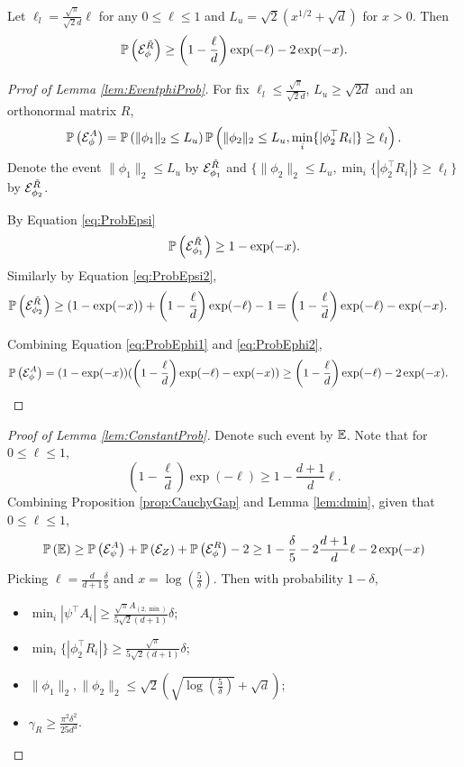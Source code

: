 \begin{lemma}
	\label{lem:EventphiProb}
	Let $\ell_l = \frac{\sqrt{\pi}}{\sqrt{2}d}\ell$ for any $0\le \ell\le 1$ and $ L_u = \sqrt{2}\left(x^{1/2}+\sqrt{d}\right)$ for $x>0$. Then
	\[
	\mathbb{P}\left(\mathcal{E}^{\tilde{R}}_{\phi}\right) \ge \left(1- \frac{\ell}{d}\right)\exp(-\ell) - 2\exp(-x).
	\]
\end{lemma}
\begin{proof}[Prrof of Lemma \ref{lem:EventphiProb}]
	For fix $\ell_l\le \frac{\sqrt{\pi}}{\sqrt{2}d}$, $L_u \ge \sqrt{2d}$ and an orthonormal matrix $R$, 
	\[
	\mathbb{P}\left(\mathcal{E}^A_{\phi}\right) = \mathbb{P}\left(\|\phi_1\|_2\le L_u\right)\mathbb{P}\left(\|\phi_2\|_2\le L_u, \min_i \{|\phi_2^{\top}R_i|\} \ge \ell_l\right).
	\]
	Denote the event $\|\phi_1\|_2\le L_u$ by $\mathcal{E}^{\tilde{R}}_{\phi_1}$ and $\{\|\phi_2\|_2\le L_u, \min_i \{|\phi_2^{\top}R_i|\} \ge \ell_l\}$ by $\mathcal{E}^{\tilde{R}}_{\phi_2}$. 
	
	By Equation \eqref{eq:ProbEpsi}
	\begin{equation}
	\label{eq:ProbEphi1}
	\mathbb{P}\left(\mathcal{E}^{\tilde{R}}_{\phi_1}\right) \ge 1-\exp(-x).
	\end{equation}
	Similarly by Equation \eqref{eq:ProbEpsi2},
	\begin{align}
	\label{eq:ProbEphi2}
	\begin{split}
	& \mathbb{P}\left(\mathcal{E}^{\tilde{R}}_{\phi_2}\right) \ge (1-\exp(-x))+\left(1- \frac{\ell}{d}\right)\exp(-\ell)-1 = \left(1- \frac{\ell}{d}\right)\exp(-\ell)-\exp(-x).
	\end{split}
	\end{align}
	
	Combining Equation \eqref{eq:ProbEphi1} and \eqref{eq:ProbEphi2},
	\begin{align*}
	\mathbb{P}\left(\mathcal{E}^A_{\phi}\right) & = (1-\exp(-x))(\left(1- \frac{\ell}{d}\right)\exp(-\ell)-\exp(-x)) \ge \left(1- \frac{\ell}{d}\right)\exp(-\ell) - 2\exp(-x).
	\end{align*}
\end{proof}
\fi

\ICAConstantProb*
\begin{proof}[Proof of Lemma \ref{lem:ConstantProb}]
	Denote such event by $\mathbb{E}$.
	Note that for $0\le \ell \le 1$, 
	\[
	\left(1- \frac{\ell}{d}\right)\exp(-\ell) \ge 1-\frac{d+1}{d}\ell.
	\]
	Combining Proposition \ref{prop:CauchyGap} and Lemma \ref{lem:dmin}, given that $0\le \ell\le1$,
	\[
	\mathbb{P}\left(\mathbb{E}\right) \ge \mathbb{P}\left(\mathcal{E}^A_{\psi}\right) + \mathbb{P}\left(\mathcal{E}_{Z}\right) + \mathbb{P}\left(\mathcal{E}^{R}_{\phi}\right) -2 \ge 1- \frac{\delta}{5}-2\frac{d+1}{d}\ell- 2\exp(-x)  
	\]
	Picking $\ell = \frac{d}{d+1}\frac{\delta}{5}$ and $ x= \log(\frac{5}{\delta})$.
	Then with probability $1-\delta$, 
	\begin{itemize}
		\item $\min_i |\psi^{\top}A_i| \ge \frac{\sqrt{\pi}A_{(2,\min)}}{5\sqrt{2}(d+1)} \delta$;
		\item $\min_i \{|\phi_2^{\top}R_i|\} \ge \frac{\sqrt{\pi}}{5\sqrt{2}(d+1)}\delta$;
		\item $\|\phi_1\|_2, \|\phi_2\|_2 \le \sqrt{2}\left(\sqrt{\log(\frac{5}{\delta})}+\sqrt{d}\right)$;
		\item $\gamma_R \ge \frac{\pi^2\delta^2}{25d^3}$.
	\end{itemize}
\end{proof}

